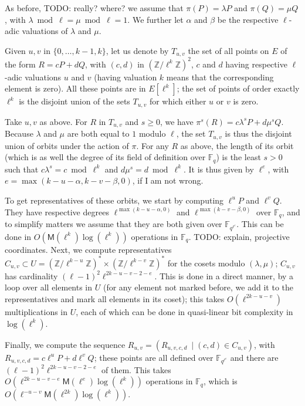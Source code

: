 \documentclass{lms}
\newcommand{\todo}[1]{{\color{red}TODO: #1}}
\newcommand{\M}{\mathsf{M}}
\newcommand{\Z}{\mathbb{Z}}
\newcommand{\F}{\mathbb{F}}
\begin{document}
As before, \todo{really? where?} we assume that $\pi(P)=\lambda P$ and
$\pi(Q) = \mu Q$, with $\lambda \bmod \ell = \mu \bmod \ell = 1$.  We
further let $\alpha$ and $\beta$ be the respective $\ell$-adic
valuations of $\lambda$ and $\mu$. 

Given $u,v$ in $\{0,\dots,k-1,k\}$, let us denote by $T_{u,v}$ the set
of all points on $E$ of the form $R=c P + d Q$, with $(c,d)$ in
$(\Z/\ell^k\Z)^2$, $c$ and $d$ having respective $\ell$-adic
valuations $u$ and $v$ (having valuation $k$ means that the
corresponding element is zero). All these points are in $E[\ell^k]$;
the set of points of order exactly $\ell^k$ is the disjoint union of
the sets $T_{u,v}$ for which either $u$ or $v$ is zero.

Take $u,v$ as above. For $R$ in $T_{u,v}$ and $s \ge 0$, we have
$\pi^s(R) = c\lambda^s P+ d \mu^s Q$.  Because $\lambda$ and $\mu$ are
both equal to $1$ modulo $\ell$, the set $T_{u,v}$ is thus the
disjoint union of orbits under the action of $\pi$. For any $R$ as
above, the length of its orbit (which is as well the degree of its
field of definition over $\F_q$) is the least $s>0$ such that $c
\lambda^s = c \bmod \ell^k$ and $d \mu^s =d \bmod \ell^k$. It is thus
given by $\ell^e$, with $e={\max(k-u-\alpha, k-v-\beta, 0)}$, if I am
not wrong.

To get representatives of these orbits, we start by computing
$\ell^uP$ and $\ell^vQ$. They have respective degrees
$\ell^{\max(k-u-\alpha, 0)}$ and $\ell^{\max(k-v-\beta, 0)}$ over
$\F_q$, and to simplify matters we assume that they are both given
over $\F_{q^{\ell^e}}$. This can be done in $O( \M(\ell^k)
\log(\ell^k))$ operations in $\F_q$. \todo{explain, projective
  coordinates}. Next, we compute representatives $C_{u,v} \subset
U=(\Z/\ell^{k-u}\Z)^* \times (\Z/\ell^{k-v}\Z)^*$ for the cosets
modulo $(\lambda, \mu)$; $C_{u,v}$ has cardinality $(\ell-1)^2
\ell^{2k-u-v-2-e}$. This is done in a direct manner, by a loop over
all elements in $U$ (for any element not marked before, we add it to
the representatives and mark all elements in its coset); this takes
$O(\ell^{2k-u-v})$ multiplications  in $U$, each of which can be
done in quasi-linear bit complexity in $\log(\ell^k)$.

Finally, we compute the sequence $R_{u,v}=(R_{u,v,c,d}\ \mid (c,d) \in
C_{u,v})$, with $R_{u,v,c,d}=c \ell^u P + d \ell^v Q$; these points
are all defined over $\F_{q^{\ell^e}}$ and there are $(\ell-1)^2
\ell^{2k-u-v-2-e}$ of them. This takes $O(\ell^{2k-u-v-e}
\M(\ell^e)\log(\ell^k))$ operations in $\F_q$, which is $O(\ell^{-u-v}
\M(\ell^{2k})\log(\ell^k))$.
\end{document}
